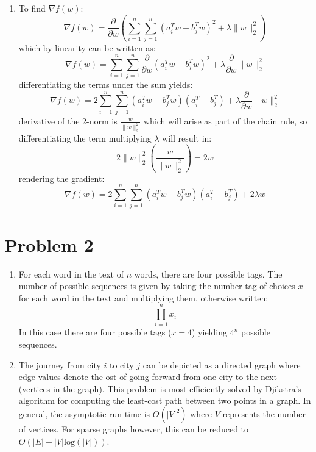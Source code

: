 \documentclass[12pt]{article}
\begin{document}
\begin{enumerate}[label=(\alph*)]
  \item To find \(\nabla f(w)\):
  \[
		\nabla f(w) = \frac{\partial}{\partial w}
    \left(\sum_{i=1}^n\sum_{j=1}^n (a_i^Tw - b_j^Tw)^2 + \lambda \lVert
    w \rVert_2^2\right)
  \]
  which by linearity can be written as:
  \[
		\nabla f(w) = \sum_{i=1}^n\sum_{j=1}^n
    \frac{\partial}{\partial w} (a_i^Tw - b_j^Tw)^2 +
    \lambda \frac{\partial}{\partial w} \lVert w \rVert_2^2
  \]
  differentiating the terms under the sum yields:
  \[
		\nabla f(w) = 2\sum_{i=1}^n\sum_{j=1}^n
    (a_i^Tw - b_j^Tw)(a_i^T - b_j^T) +
    \lambda \frac{\partial}{\partial w} \lVert w \rVert_2^2
  \]
  derivative of the 2-norm is \(\frac{w}{\lVert w \rVert_2^2}\) which
  will arise as part of the chain rule, so differentiating the term
  multiplying \(\lambda\) will result in:
  \[
		2 \lVert w \rVert_2^2 \left( \frac{w}{\lVert w \rVert_2^2} \right) = 2w
  \]
  rendering the gradient:
  \[
		\nabla f(w) = 2\sum_{i=1}^n\sum_{j=1}^n
    (a_i^Tw - b_j^Tw)(a_i^T - b_j^T) +
    2\lambda w
  \]


\end{enumerate}

\section*{Problem 2}

\begin{enumerate}[label=(\alph*)]
  \item For each word in the text of \(n\) words, there are four possible tags.
  The number of possible sequences is given by taking the number tag of choices
  \(x\) for each word in the text and multiplying them, otherwise written:
  \[
		\prod_{i=1}^nx_i
  \]
  In this case there are four possible tags (\(x=4\)) yielding \(4^n\) possible
  sequences.

  \item The journey from city \(i\) to city \(j\) can be depicted as a
  directed graph where edge values denote the ost of going forward from
  one city to the next (vertices in the graph). This problem is most
  efficiently solved by Djikstra's algorithm for computing the least-cost
  path between two points in a graph. In general, the asymptotic run-time is
  \(O(\lvert V \rvert^2)\) where \(V\) represents the number of vertices. For
  sparse graphs however, this can be reduced to
  \(O(\lvert E \rvert + \lvert V \rvert \text{log}( \lvert V \rvert ))\).
\end{enumerate}
\end{document}
